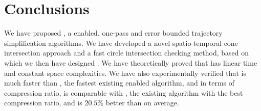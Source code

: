 \section{Conclusions} %

We have proposed \cist, a \sed enabled, one-pass and error bounded trajectory simplification algorithms.
%
We have developed a novel spatio-temporal cone intersection approach and a fast circle intersection checking method, based on which we then have designed \cist.
%
We have theoretically proved that \cist has linear time and constant space complexities.
%
We have also experimentally verified that \cist is much faster than \squishe, the fastest existing \sed enabled \lsa algorithm,
and in terms of compression ratio, \cist is \textcolor[rgb]{1.00,0.00,0.00}{comparable} with \dpa, the existing \lsa algorithm with the best compression ratio, and is $20.5\%$ better than \squishe on average.

